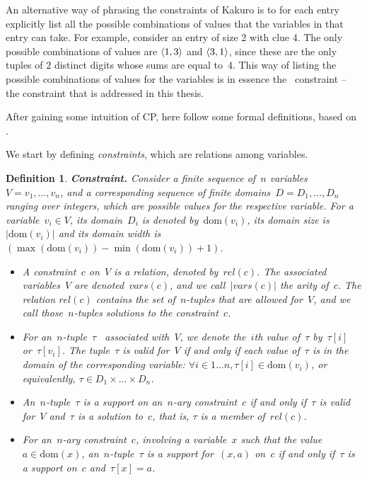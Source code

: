 \documentclass[a4paper,11pt]{article}
\newtheorem{definition}{Definition}
\newcommand{\Table}{\Constraint{Table}}
\newcommand{\Dom}[1]{\text{dom}({#1})}
\numberwithin{equation}{section}
\begin{document}
An alternative way of phrasing the constraints of Kakuro is to for each entry
explicitly list all the possible combinations
of values that the variables in that entry can take.
For example, consider an entry of size 2 with clue 4. The only
possible combinations of values are $\left\langle1,3\right\rangle$ and $\left\langle3,1\right\rangle$, since
these are the only tuples of $2$ distinct digits whose sums are 
equal to~$4$. This way of listing the possible combinations of 
values for the variables is in essence the 
\Table~constraint -- the constraint that is
addressed in this thesis.

\smallskip 

After gaining some intuition of CP, here follow some formal definitions, based on
\cite{Apt:constraintsBook,SchulteCarlsson:FDsys,Gecode:MPG}.%

We start by defining \emph{constraints}, which are relations
among variables.

\begin{definition}
  \label{def:constraint}
  \textbf{Constraint.} Consider a finite sequence of~$n$ 
  variables~$V = v_1,\ldots,v_n$, and a corresponding sequence of
  finite \emph{domains}~$D = D_1,\ldots,D_n$ ranging over integers,
  which are possible values for the
  respective variable. 
  For a variable~$v_i \in V$, its domain~$D_i$ is denoted 
  by~$\Dom{v_i}$, its \emph{domain size} is~$|\Dom{v_i}|$ and its \emph{domain width}
  is $(\max(\Dom{v_i}) - \min(\Dom{v_i}) + 1)$.
  \begin{itemize}
    \item   A \emph{constraint}~$c$ on~$V$ is a relation, 
      denoted by~$rel(c)$. The associated variables~$V$ are denoted~$\mathit{vars}(c)$,
      and we call~$|\mathit{vars}(c)|$ the \emph{arity} of~$c$. The relation
      $rel(c)$ contains the set of~$n$-tuples that are allowed
      for~$V$, and we call those~$n$-tuples \emph{solutions} to the constraint~$c$.
    \item   For an~$n$-tuple~$\tau$~%
      associated with~$V$, we
      denote the~$i$th value of~$\tau$ by~$\tau[i]$ or~$\tau[v_i]$. The 
      tuple~$\tau$ is \emph{valid} for~$V$
      if and only if each value of~$\tau$ is in the domain of the corresponding
      variable: $\forall i \in 1 \ldots n, \tau[i] \in \Dom{v_i}$, or equivalently,
      $\tau \in D_1 \times \dots \times D_n$.
    \item An~$n$-tuple~$\tau$ is a \emph{support} on an~$n$-ary constraint~$c$ if and only
      if~$\tau$ is valid for~$V$ and~$\tau$ is a solution to~$c$, that is,
      $\tau$ is a member of~$rel(c)$.
    \item For an~$n$-ary constraint~$c$, involving a variable~$x$ such that
      the value~$a \in \Dom{x}$, an~$n$-tuple~$\tau$ is a 
      \emph{support for}~$(x,a)$ on~$c$ if and only if~$\tau$ is a support on~$c$
      and~$\tau[x] = a$.
    \end{itemize}
\end{definition}
\end{document}
